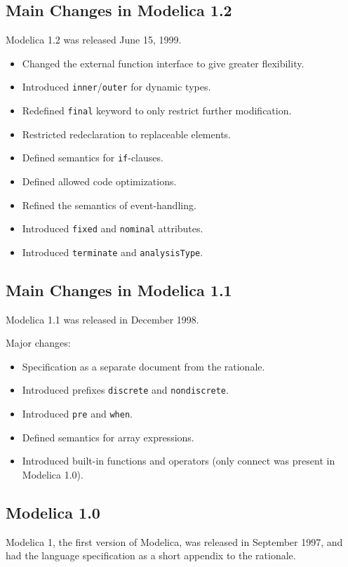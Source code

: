 \subsection{Main Changes in Modelica 1.2}\label{main-changes-in-modelica-1-2}

Modelica 1.2 was released June 15, 1999.
\begin{itemize}
\item
  Changed the external function interface to give greater flexibility.
\item
  Introduced \lstinline!inner!/\lstinline!outer! for dynamic types.
\item
  Redefined \lstinline!final! keyword to only restrict further
  modification.
\item
  Restricted redeclaration to replaceable elements.
\item
  Defined semantics for \lstinline!if!-clauses.
\item
  Defined allowed code optimizations.
\item
  Refined the semantics of event-handling.
\item
  Introduced \lstinline!fixed! and \lstinline!nominal! attributes.
\item
  Introduced \lstinline!terminate! and \lstinline!analysisType!.
\end{itemize}

\subsection{Main Changes in Modelica 1.1}\label{main-changes-in-modelica-1-1}

Modelica 1.1 was released in December 1998.

Major changes:
\begin{itemize}
\item
  Specification as a separate document from the rationale.
\item
  Introduced prefixes \lstinline!discrete! and \lstinline[morekeywords={[2]{nondiscrete}}]!nondiscrete!.
\item
  Introduced \lstinline!pre! and \lstinline!when!.
\item
  Defined semantics for array expressions.
\item
  Introduced built-in functions and operators (only connect was present in Modelica 1.0).
\end{itemize}

\subsection{Modelica 1.0}\label{modelica-1-0}

Modelica 1, the first version of Modelica, was released in September
1997, and had the language specification as a short appendix to the
rationale.
